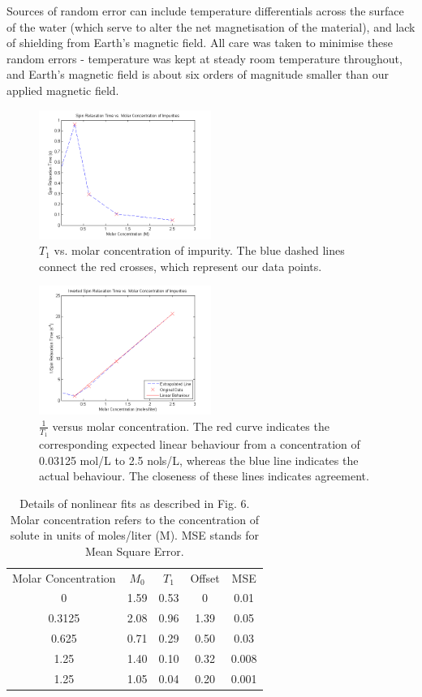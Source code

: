 \documentclass[aps,prl,nofootinbib,twocolumn,superscriptaddress,groupedaddress]{revtex4}  %
\begin{document}
Sources of random error can include temperature differentials across the surface of the water (which serve to alter the net magnetisation of the material), and lack of shielding from Earth's magnetic field. All care was taken to minimise these random errors - temperature was kept at steady room temperature throughout, and Earth's magnetic field is about six orders of magnitude smaller than our applied magnetic field.

\begin{figure}[t]
\centering
\includegraphics[width=0.5\textwidth]{../Analysis/T1impurity.png} 
\caption{$T_{1}$ vs. molar concentration of impurity. The blue dashed lines connect the red crosses, which represent our data points.} 
\end{figure}

\begin{figure}[t]
\centering
\includegraphics[width=0.5\textwidth]{../Analysis/T1impurity2.png} 
\caption{$\frac{1}{T_{1}}$ versus molar concentration. The red curve indicates the corresponding expected linear behaviour from a concentration of 0.03125 mol/L to 2.5 nols/L, whereas the blue line indicates the actual behaviour. The closeness of these lines indicates agreement.} 
\end{figure}

\begin{table}[b]
\caption{Details of nonlinear fits as described in Fig. 6. Molar concentration refers to the concentration of solute in units of moles/liter (M). MSE stands for Mean Square Error.}
\begin{ruledtabular}
\begin{tabular}{ccccc}
Molar Concentration & $M_{0}$ & $T_{1}$ & Offset & MSE\\
0 & 1.59 & 0.53 & 0 & 0.01\\
0.3125 & 2.08 & 0.96 & 1.39 & 0.05\\
0.625 & 0.71 & 0.29 & 0.50 & 0.03\\
1.25 & 1.40 & 0.10 & 0.32 & 0.008\\
1.25 & 1.05 & 0.04 & 0.20 & 0.001\\
\end{tabular}
\end{ruledtabular}
\end{table}
\end{document}

